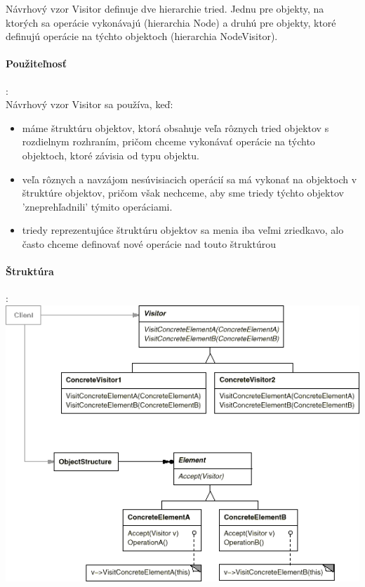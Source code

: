 		Návrhový vzor Visitor definuje dve hierarchie tried. Jednu pre objekty, na ktorých sa operácie vykonávajú (hierarchia Node) a druhú pre objekty, ktoré definujú operácie na týchto objektoch (hierarchia NodeVisitor).

		\paragraph{Použiteľnosť}:\\
		Návrhový vzor Visitor sa používa, keď:
			\begin{itemize}
				\item máme štruktúru objektov, ktorá obsahuje veľa rôznych tried objektov s rozdielnym rozhraním, pričom chceme vykonávať operácie na týchto objektoch, ktoré závisia od typu objektu.
				\item veľa rôznych a navzájom nesúvisiacich operácií sa má vykonať na objektoch v štruktúre objektov, pričom však nechceme, aby sme triedy týchto objektov 'zneprehľadnili' týmito operáciami.
				\item triedy reprezentujúce štruktúru objektov sa menia iba veľmi zriedkavo, alo často chceme definovať nové operácie nad touto štruktúrou
			\end{itemize}
		\paragraph{Štruktúra}:\\
			\includegraphics[width=.9\textwidth]{images/programovanie/visitor3}

